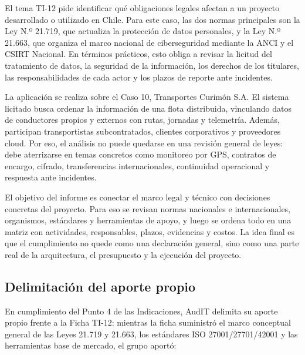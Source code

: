El tema TI-12 pide identificar qué obligaciones legales afectan a un proyecto desarrollado o utilizado en Chile. Para este caso, las dos normas principales son la Ley N.º 21.719, que actualiza la protección de datos personales, y la Ley N.º 21.663, que organiza el marco nacional de ciberseguridad mediante la ANCI y el CSIRT Nacional. En términos prácticos, esto obliga a revisar la licitud del tratamiento de datos, la seguridad de la información, los derechos de los titulares, las responsabilidades de cada actor y los plazos de reporte ante incidentes.

La aplicación se realiza sobre el Caso 10, Transportes Curimón S.A. El sistema licitado busca ordenar la información de una flota distribuida, vinculando datos de conductores propios y externos con rutas, jornadas y telemetría. Además, participan transportistas subcontratados, clientes corporativos y proveedores cloud. Por eso, el análisis no puede quedarse en una revisión general de leyes: debe aterrizarse en temas concretos como monitoreo por GPS, contratos de encargo, cifrado, transferencias internacionales, continuidad operacional y respuesta ante incidentes.

El objetivo del informe es conectar el marco legal y técnico con decisiones concretas del proyecto. Para eso se revisan normas nacionales e internacionales, organismos, estándares y herramientas de apoyo, y luego se ordena todo en una matriz con actividades, responsables, plazos, evidencias y costos. La idea final es que el cumplimiento no quede como una declaración general, sino como una parte real de la arquitectura, el presupuesto y la ejecución del proyecto.

\subsection{Delimitación del aporte propio}\label{delimitaciuxf3n-del-aporte-propio}

En cumplimiento del Punto 4 de las Indicaciones, AudIT delimita su aporte propio frente a la Ficha TI-12: mientras la ficha suministró el marco conceptual general de las Leyes 21.719 y 21.663, los estándares ISO 27001/27701/42001 y las herramientas base de mercado, el grupo aportó:

